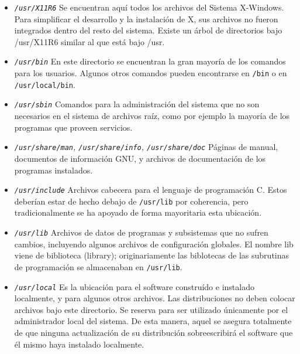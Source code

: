 \begin{itemize} 
	
	\item \textit{\texttt{/usr/X11R6}}
	 Se encuentran aquí todos los archivos del Sistema
	X-Windows. Para simplificar el desarrollo y la instalación de X,  sus
	archivos no fueron integrados dentro del resto del sistema. Existe un
	árbol de directorios bajo /usr/X11R6 similar al que está bajo /usr.
	


	\item \textit{\texttt{/usr/bin}}
	 En este directorio se encuentran la gran mayoría de los
	comandos para los usuarios. Algunos otros comandos pueden encontrarse en
	\texttt{/bin} o en 	\texttt{/usr/local/bin}.
	

	\item \textit{\texttt{/usr/sbin}}
	 Comandos para la administración del sistema que no son
	necesarios en el sistema de archivos raíz, como por ejemplo la mayoría
	de los programas que proveen servicios.  

	\item \textit{\texttt{/usr/share/man},
	\texttt{/usr/share/info},
	\texttt{/usr/share/doc}}  Páginas
	de manual, documentos de información GNU, y 		archivos de
	documentación de los programas instalados.
	

	\item \textit{\texttt{/usr/include}}
	 Archivos cabecera para el lenguaje de programación C.
	Estos deberían estar de hecho debajo de \texttt{/usr/lib}
	por coherencia, pero tradicionalmente se ha apoyado de forma mayoritaria
	esta ubicación.  

	\item \textit{\texttt{/usr/lib}}
	 Archivos de datos de programas y subsistemas que no
	sufren cambios, incluyendo algunos archivos de configuración globales.
	El nombre lib viene de biblioteca (library); originariamente las
	biblotecas de las subrutinas de programación se
	almacenaban en \texttt{/usr/lib}.
	

	\item \textit{\texttt{/usr/local}}
	 Es la ubicación para el software construído e instalado localmente, y
	para algunos otros archivos.  Las distribuciones no deben colocar
	archivos bajo este directorio. Se 			reserva para ser
	utilizado únicamente por el administrador local del
	sistema. De esta manera, aquel se asegura totalmente de que ninguna
	actualización de su distribución sobreescribirá  el software que él
	mismo haya instalado localmente.


 \end{itemize} 




